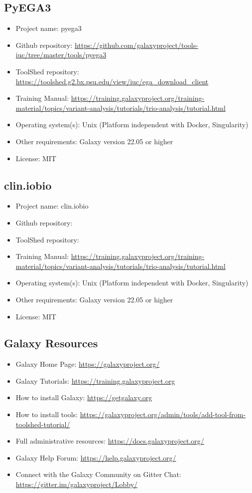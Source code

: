 \subsection*{PyEGA3}
\begin{itemize}
    \item Project name: pyega3
    \item Github repository: \url{https://github.com/galaxyproject/tools-iuc/tree/master/tools/pyega3}
    \item ToolShed repository: \url{https://toolshed.g2.bx.psu.edu/view/iuc/ega_download_client}
    \item Training Manual: \url{https://training.galaxyproject.org/training-material/topics/variant-analysis/tutorials/trio-analysis/tutorial.html}
    \item Operating system(s): Unix (Platform independent with Docker, Singularity)
    \item Other requirements: Galaxy version 22.05 or higher
    \item License: MIT
\end{itemize}

\subsection*{clin.iobio}
\begin{itemize}
    \item Project name: clin.iobio
    \item Github repository: \url{}
    \item ToolShed repository: \url{}
    \item Training Manual: \url{https://training.galaxyproject.org/training-material/topics/variant-analysis/tutorials/trio-analysis/tutorial.html}
    \item Operating system(s): Unix (Platform independent with Docker, Singularity)
    \item Other requirements: Galaxy version 22.05 or higher
    \item License: MIT
\end{itemize}

\subsection*{Galaxy Resources}
\begin{itemize}
    \item Galaxy Home Page: \url{https://galaxyproject.org/}
    \item Galaxy Tutorials: \url{https://training.galaxyproject.org}
    \item How to install Galaxy: \url{https://getgalaxy.org}
    \item How to install tools: \url{https://galaxyproject.org/admin/tools/add-tool-from-toolshed-tutorial/}
\item Full administrative resources: \url{https://docs.galaxyproject.org/}
    \item Galaxy Help Forum: \url{https://help.galaxyproject.org/}
    \item Connect with the Galaxy Community on Gitter Chat: \url{https://gitter.im/galaxyproject/Lobby/}
\end{itemize}

